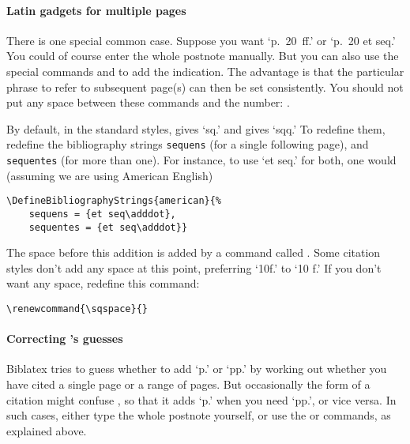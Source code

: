 \paragraph{Latin gadgets for multiple pages}There is one special
common case. Suppose you want `p.~20~ff.' or `p.~20 et seq.'  You
could of course enter the whole postnote manually. But you can also
use the special commands  and  to
add the indication. The advantage is that the particular phrase to
refer to subsequent page(s) can then be set consistently. You should
not put any space between these commands and the number:
.

By default, in the standard styles,  gives `sq.' and 
gives `sqq.' To redefine them, redefine the bibliography strings
\verb|sequens| (for a single following page), and \verb|sequentes|
(for more than one). For instance, to use `et seq.' for both, one
would (assuming we are using American English)
\begin{verbatim}
\DefineBibliographyStrings{american}{%
    sequens = {et seq\adddot},
    sequentes = {et seq\adddot}}
\end{verbatim}
The space before this addition is added by a command called
. Some citation styles don't add any space at this point,
preferring `10f.' to `10 f.' If you don't want any space, redefine
this command:
\begin{center}
\verb|\renewcommand{\sqspace}{}|
\end{center}

\paragraph{Correcting \biblatex's guesses} \textsf{Biblatex} tries to
guess whether to add `p.' or `pp.' by working out whether you have
cited a single page or a range of pages. But occasionally the form of a
citation might confuse \biblatex, so that it adds `p.' when you need
`pp.', or vice versa. In such cases, either type the whole postnote
yourself, or use the  or  commands, as explained above.

